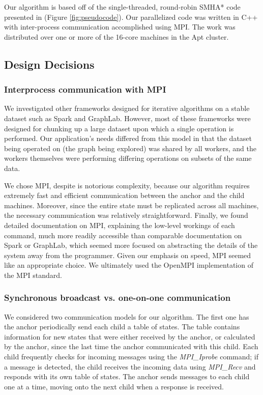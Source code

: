 \documentclass[11pt]{article}
\begin{document}
Our algorithm is based off of the single-threaded, round-robin SMHA* code presented in \cite{Aine14} (Figure \ref{fig:pseudocode}). Our parallelized code was written in C++ with inter-process communication accomplished using MPI. The work was distributed over one or more of the 16-core machines in the Apt cluster. %

\subsection{Design Decisions}

\subsubsection*{Interprocess communication with MPI}

We investigated other frameworks designed for iterative algorithms on a stable dataset such as Spark and GraphLab. However, most of these frameworks were designed for chunking up a large dataset upon which a single operation is performed. Our application's needs differed from this model in that the dataset being operated on (the graph being explored) was shared by all workers, and the workers themselves were performing differing operations on subsets of the same data.

We chose MPI, despite is notorious complexity, because our algorithm requires extremely fast and efficient communication between the anchor and the child machines. Moreover, since the entire state must be replicated across all machines, the necessary communication was relatively straightforward. Finally, we found detailed documentation on MPI, explaining the low-level workings of each command, much more readily accessible than comparable documentation on Spark or GraphLab, which seemed more focused on abstracting the details of the system away from the programmer. Given our emphasis on speed, MPI seemed like an appropriate choice. We ultimately used the OpenMPI implementation of the MPI standard.

\subsubsection*{Synchronous broadcast vs. one-on-one communication}

We considered two communication models for our algorithm. The first one has the anchor periodically send each child a table of states. The table contains information for new states that were either received by the anchor, or calculated by the anchor, since the last time the anchor communicated with this child. Each child frequently checks for incoming messages using the \emph{MPI\_Iprobe} command; if a message is detected, the child receives the incoming data using \emph{MPI\_Recv} and responds with its own table of states. The anchor sends messages to each child one at a time, moving onto the next child when a response is received.
\end{document}
